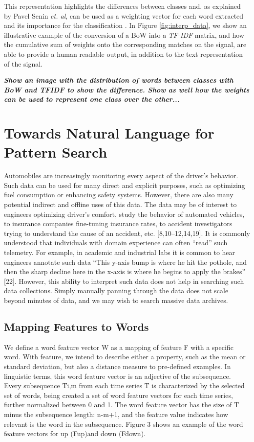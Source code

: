 {This representation highlights the differences between classes and, as explained by Pavel Senin \textit{et. al}, can be used as a weighting vector for each word extracted and its importance for the classification \cite{sax_vsm}. In Figure \ref{fig:interp_data}, we show an illustrative example of the conversion of a BoW into a \textit{TF-IDF} matrix, and how the cumulative sum of weights onto the corresponding matches on the signal, are able to provide a human readable output, in addition to the text representation of the signal. 
\par
\textit{\textbf{Show an image with the distribution of words between classes with BoW and TFIDF to show the difference. Show as well how the weights can be used to represent one class over the other...}} 



\section{Towards Natural Language for Pattern Search}

Automobiles are increasingly monitoring every aspect of the driver’s behavior. Such data can be used for many direct and explicit purposes, such as optimizing fuel consumption or enhancing safety systems. However, there are also many potential indirect and offline uses of this data. The data may be of interest to engineers optimizing driver’s comfort, study the behavior of automated vehicles, to insurance companies fine-tuning insurance rates, to accident investigators trying to understand the cause of an accident, etc. [8,10–12,14,19]. It is commonly understood that individuals with domain experience can often “read” such telemetry. For example, in academic and industrial labs it is common to hear engineers annotate such data “This y-axis bump is where he hit the pothole, and then the sharp decline here in the x-axis is where he begins to apply the brakes” [22]. However, this ability to interpret such data does not help in searching such data collections. Simply manually panning through the data does not scale beyond minutes of data, and we may wish to search massive data archives.

\subsection{Mapping Features to Words}

We define a word feature vector W as a mapping of feature F with a specific word. With feature, we intend to describe either a property, such as the mean or standard deviation, but also a distance measure to pre-defined examples. In linguistic terms, this word feature vector is an adjective of the subsequence. Every subsequence Ti,m from each time series T is characterized by the selected set of words,  being created a set of word feature vectors for each time series, further normalized between 0 and 1. The word feature vector has the size of T minus the subsequence length: n-m+1, and the feature value indicates how relevant is the word in the subsequence. Figure 3 shows an example of the word feature vectors for up (Fup)and down (Fdown).

}
